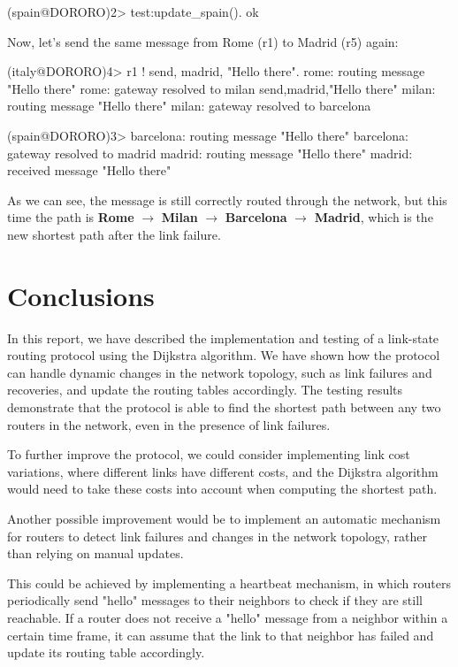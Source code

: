 \documentclass[a4paper, 11pt]{article}
\begin{document}
\begin{mylisting}
(spain@DORORO)2> test:update_spain().
ok
\end{mylisting}

Now, let's send the same message from Rome (r1) to Madrid (r5) again:

\begin{mylisting}
(italy@DORORO)4> r1 ! {send, madrid, "Hello there"}.
rome: routing message "Hello there"
rome: gateway resolved to milan
{send,madrid,"Hello there"}
milan: routing message "Hello there"
milan: gateway resolved to barcelona
\end{mylisting}

\begin{mylisting}
(spain@DORORO)3> barcelona: routing message "Hello there"
barcelona: gateway resolved to madrid
madrid: routing message "Hello there"
madrid: received message "Hello there"
\end{mylisting}

As we can see, the message is still correctly routed through the network, but this time the path is \textbf{Rome} $\to$ \textbf{Milan} $\to$ \textbf{Barcelona} $\to$ \textbf{Madrid}, which is the new shortest path after the link failure.

\section{Conclusions}

In this report, we have described the implementation and testing of a link-state routing protocol using the Dijkstra algorithm. We have shown how the protocol can handle dynamic changes in the network topology, such as link failures and recoveries, and update the routing tables accordingly. The testing results demonstrate that the protocol is able to find the shortest path between any two routers in the network, even in the presence of link failures.


To further improve the protocol, we could consider implementing link cost variations, where different links have different costs, and the Dijkstra algorithm would need to take these costs into account when computing the shortest path. 

Another possible improvement would be to implement an automatic mechanism for routers to detect link failures and changes in the network topology, rather than relying on manual updates.

This could be achieved by implementing a heartbeat mechanism, in which routers periodically send "hello" messages to their neighbors to check if they are still reachable. If a router does not receive a "hello" message from a neighbor within a certain time frame, it can assume that the link to that neighbor has failed and update its routing table accordingly.
\end{document}
